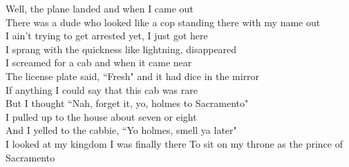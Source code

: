 \documentclass{article}
\begin{document}
Well, the plane landed and when I came out \\
There was a dude who looked like a cop standing there with my name out \\
I ain't trying to get arrested yet, I just got here \\
I sprang with the quickness like lightning, disappeared \\

I screamed for a cab and when it came near \\
The license plate said, ``Fresh" and it had dice in the mirror \\
If anything I could say that this cab was rare \\
But I thought ``Nah, forget it, yo, holmes to Sacramento" \\

I pulled up to the house about seven or eight \\
And I yelled to the cabbie, ``Yo holmes, smell ya later" \\
I looked at my kingdom
I was finally there
To sit on my throne as the prince of Sacramento
\end{document}
